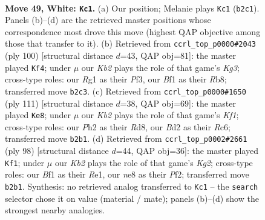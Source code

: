 \documentclass[11pt]{article}
\begin{document}
\clearpage

\begin{figure}[p]\centering
\begin{subfigure}{0.46\textwidth}\centering
\resizebox{\linewidth}{!}{%
\newchessgame
\chessboard[
  setfen={4n3/p1p5/2k5/5p2/r4P1R/8/rK1B3P/5BR1 w - - 2 49},
  showmover=false,
  pgfstyle=straightmove, color=movearrow, markmove={b2-c1}
]}
\caption{}
\end{subfigure}\hfill
\begin{subfigure}{0.46\textwidth}\centering
\resizebox{\linewidth}{!}{%
\newchessgame
\chessboard[
  setfen={1R5R/p4p2/5kp1/8/7P/4PPK1/6rr/8 w - - 5 51},
  showmover=false,
  pgfstyle=straightmove, color=movearrow, markmove={g3-f4}
]}
\caption{}
\end{subfigure}
\\[4pt]
\begin{subfigure}{0.46\textwidth}\centering
\resizebox{\linewidth}{!}{%
\newchessgame
\chessboard[
  setfen={3r1k2/5RR1/2r3pp/P5b1/4p3/6P1/4PPK1/8 b - - 4 56},
  showmover=false,
  pgfstyle=straightmove, color=movearrow, markmove={f8-e8}
]}
\caption{}
\end{subfigure}\hfill
\begin{subfigure}{0.46\textwidth}\centering
\resizebox{\linewidth}{!}{%
\newchessgame
\chessboard[
  setfen={8/4k3/r2p4/P1pPn1p1/4B1r1/R7/5PK1/4R3 w - - 5 50},
  showmover=false,
  pgfstyle=straightmove, color=movearrow, markmove={g2-f1}
]}
\caption{}
\end{subfigure}
\caption{\textbf{Move 49, White: \texttt{Kc1}.} (a) Our position; Melanie plays \texttt{Kc1} (\texttt{b2c1}). Panels (b)--(d) are the retrieved master positions whose correspondence most drove this move (highest QAP objective among those that transfer to it). (b) Retrieved from \texttt{ccrl\_top\_p0000\#2043} (ply 100) [structural distance $d$=43, QAP obj=81]: the master played \texttt{Kf4}; under $\mu$ our \emph{Kb2} plays the role of that game's \emph{Kg3}; cross-type roles: our \emph{R}g1 as their \emph{P}f3, our \emph{B}f1 as their \emph{R}b8; transferred move \texttt{b2c3}. (c) Retrieved from \texttt{ccrl\_top\_p0000\#1650} (ply 111) [structural distance $d$=38, QAP obj=69]: the master played \texttt{Ke8}; under $\mu$ our \emph{Kb2} plays the role of that game's \emph{Kf1}; cross-type roles: our \emph{P}h2 as their \emph{R}d8, our \emph{B}d2 as their \emph{R}c6; transferred move \texttt{b2b1}. (d) Retrieved from \texttt{ccrl\_top\_p0002\#2661} (ply 98) [structural distance $d$=44, QAP obj=36]: the master played \texttt{Kf1}; under $\mu$ our \emph{Kb2} plays the role of that game's \emph{Kg2}; cross-type roles: our \emph{B}f1 as their \emph{R}e1, our \emph{n}e8 as their \emph{P}f2; transferred move \texttt{b2b1}. Synthesis: no retrieved analog transferred to \texttt{Kc1} -- the \texttt{search} selector chose it on value (material / mate); panels (b)--(d) show the strongest nearby analogies.}
\label{fig:thought-m96}
\end{figure}
\end{document}
